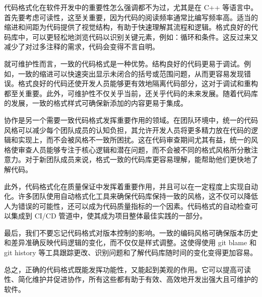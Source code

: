 代码格式化在软件开发中的重要性怎么强调都不为过，尤其是在 C++ 等语言中。首先要考虑可读性，这至关重要，因为代码的阅读频率通常比编写频率高。适当的缩进和间距为代码提供了视觉结构，有助于快速理解其流程和逻辑。格式良好的代码库中，可以更轻松地浏览代码以识别关键元素，例如：循环和条件。这反过来又减少了对过多注释的需求，代码会变得不言自明。

就可维护性而言，一致的代码格式是一种优势。结构良好的代码更易于调试。例如，一致的缩进可以快速突出显示未闭合的括号或范围问题，从而更容易发现错误。格式良好的代码还使开发人员能够更有效地隔离代码部分，这对于调试和重构都至关重要。此外，可维护性不仅关乎当前，还关乎代码的未来发展。随着代码库的发展，一致的格式样式可确保新添加的内容更易于集成。

协作是另一个需要一致代码格式发挥重要作用的领域。在团队环境中，统一的代码风格可以减少每个团队成员的认知负担，其允许开发人员将更多精力放在代码的逻辑和实现上，而不会被风格不一致所困扰。这在代码审查期间尤其有益，统一的风格使审查人员能够专注于核心逻辑和潜在问题，而不会被不同的格式风格所分散注意力。对于新团队成员来说，格式一致的代码库更容易理解，能帮助他们更快地了解代码。

此外，代码格式化在质量保证中发挥着重要作用，并且可以在一定程度上实现自动化。许多团队使用自动格式化工具来确保代码库保持一致的风格，这不仅可以降低人为错误的可能性，还可以成为代码质量指标的一个因素。代码格式的自动检查可以集成到 CI/CD 管道中，使其成为项目整体最佳实践的一部分。

最后，我们不要忘记代码格式对版本控制的影响。一致的编码风格可确保版本历史和差异准确反映代码逻辑的变化，而不仅仅是样式调整。这使得使用 git blame 和 git history 等工具跟踪更改、识别问题和了解代码库随时间的变化变得更加容易。

总之，正确的代码格式既能发挥功能性，又能起到美观的作用。它可以提高可读性、简化维护并促进协作，所有这些都有助于有效、高效地开发出强大且可维护的软件。
